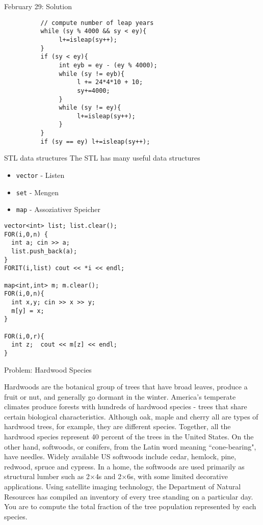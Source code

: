 \documentclass[12pt,t]{beamer}
\newcommand{\bi}{\begin{itemize}}
\newcommand{\ei}{\end{itemize}}
\begin{document}
\begin{frame}[fragile]{February 29: Solution}
    \begin{verbatim}
          // compute number of leap years
          while (sy % 4000 && sy < ey){
               l+=isleap(sy++);
          }
          if (sy < ey){
               int eyb = ey - (ey % 4000);
               while (sy != eyb){
                    l += 24*4*10 + 10;
                    sy+=4000;
               }
               while (sy != ey){
                    l+=isleap(sy++);
               }
          }
          if (sy == ey) l+=isleap(sy++);
\end{verbatim}
\end{frame}





\begin{frame}[fragile]{STL data structures}
  The STL has many useful data structures
  \bi
    \item \texttt{vector} - Listen
    \item \texttt{set} - Mengen
    \item \texttt{map} - Assoziativer Speicher
  \ei
\begin{verbatim}
vector<int> list; list.clear();
FOR(i,0,n) {
  int a; cin >> a;
  list.push_back(a);
}
FORIT(i,list) cout << *i << endl;

map<int,int> m; m.clear();
FOR(i,0,n){
  int x,y; cin >> x >> y;
  m[y] = x;
}

FOR(i,0,r){
  int z;  cout << m[z] << endl;
}
\end{verbatim}
\end{frame}


\begin{frame}{Problem: Hardwood Species}

\vspace{0pt}

{\footnotesize
Hardwoods are the botanical group of trees that have broad leaves, produce a fruit or nut, and generally go dormant in the winter.
America's temperate climates produce forests with hundreds of
hardwood species - trees that share certain biological characteristics.
Although oak, maple and cherry all are types of hardwood
trees, for example, they are different species. Together, all the hardwood species represent 40 percent of the trees in the United States.
On the other hand, softwoods, or conifers, from the Latin word
meaning ``cone-bearing", have needles.  Widely available US softwoods include cedar, hemlock, pine, redwood, spruce and cypress.  In a home, the softwoods are used primarily as structural
lumber such as 2$\times$4s and 2$\times$6s, with some limited decorative applications.
Using satellite imaging technology, the Department of Natural Resources has compiled an inventory of every tree standing on a particular day.
You are to compute the total fraction of the tree population represented by each species.
}
\end{frame}
\end{document}

